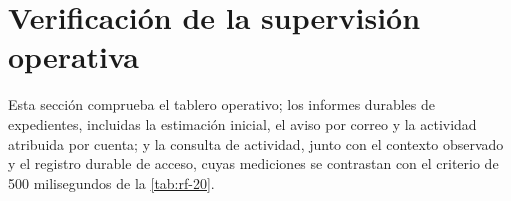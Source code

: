 
\section{Verificación de la supervisión operativa}\label{sec:pruebas-supervision}

Esta sección comprueba el tablero operativo; los informes durables de expedientes, incluidas la estimación inicial, el aviso por correo y la actividad atribuida por cuenta; y la consulta de actividad, junto con el contexto observado y el registro durable de acceso, cuyas mediciones se contrastan con el criterio de 500 milisegundos de la \cref{tab:rf-20}.






